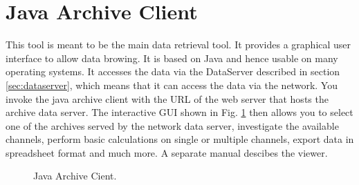 \section{Java Archive Client} \label{sec:javaclient}
This tool is meant to be the main data retrieval tool. It provides a
graphical user interface to allow data browing. It is based on Java
and hence usable on many operating systems. It accesses the data via
the DataServer described in section \ref{sec:dataserver}, which means
that it can access the data via the network.  You invoke the java
archive client with the URL of the web server that hosts the archive
data server. The interactive GUI shown in Fig. \ref{fig:javatool} then
allows you to select one of the archives served by the network data
server, investigate the available channels, perform basic calculations
on single or multiple channels, export data in spreadsheet format and
much more.
A separate manual descibes the viewer.

\medskip

\begin{figure}[htb]
\begin{center}
\end{center}
\caption{\label{fig:javatool}Java Archive Cient.}
\end{figure}
